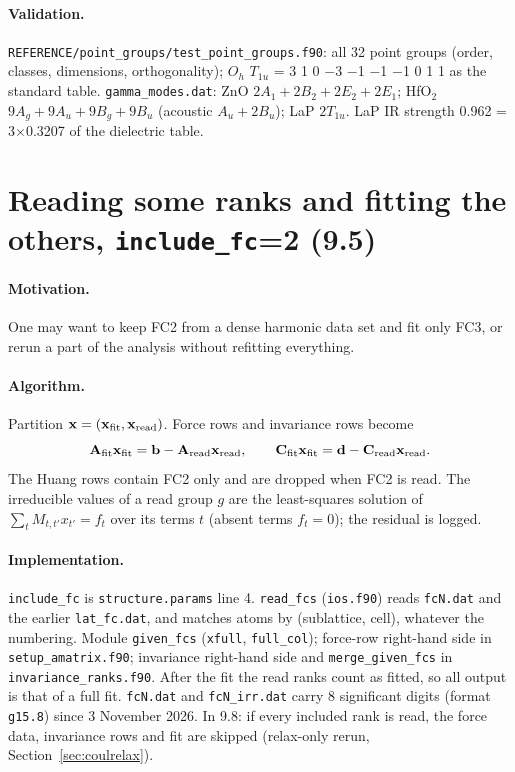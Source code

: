 \documentclass[11pt,a4paper]{article}
\newcommand{\bA}{\mathbf A}
\newcommand{\bC}{\mathbf C}
\newcommand{\bx}{\mathbf x}
\newcommand{\bb}{\mathbf b}
\newcommand{\bd}{\mathbf d}
\newcommand{\code}[1]{\texttt{#1}}
\begin{document}
\paragraph{Validation.} \code{REFERENCE/point\_groups/test\_point\_groups.f90}: all 32 point groups (order,
classes, dimensions, orthogonality); $O_h$ $T_{1u}$ = 3 1 0 $-$3 $-$1 $-$1 $-$1 0 1 1 as the standard table.
\code{gamma\_modes.dat}: ZnO $2A_1+2B_2+2E_2+2E_1$; HfO$_2$ $9A_g+9A_u+9B_g+9B_u$ (acoustic $A_u+2B_u$); LaP
$2T_{1u}$. LaP IR strength 0.962 = 3$\times$0.3207 of the dielectric table.

\section{\texorpdfstring{Reading some ranks and fitting the others, \code{include\_fc}=2 (9.5)}{Reading some ranks and fitting the others, include\_fc=2 (9.5)}}\label{sec:incl2}
\paragraph{Motivation.} One may want to keep FC2 from a dense harmonic data set and fit only FC3, or rerun a
part of the analysis without refitting everything.

\paragraph{Algorithm.} Partition $\bx=(\bx_{\rm fit},\bx_{\rm read})$. Force rows and invariance rows
become
\begin{equation}
\bA_{\rm fit}\bx_{\rm fit}=\bb-\bA_{\rm read}\bx_{\rm read},\qquad
\bC_{\rm fit}\bx_{\rm fit}=\bd-\bC_{\rm read}\bx_{\rm read} .
\end{equation}
The Huang rows contain FC2 only and are dropped when FC2 is read. The irreducible values of a read group
$g$ are the least-squares solution of $\sum_tM_{t,t'}x_{t'}=f_t$ over its terms $t$ (absent terms
$f_t=0$); the residual is logged.

\paragraph{Implementation.} \code{include\_fc} is \code{structure.params} line 4. \code{read\_fcs}
(\code{ios.f90}) reads \code{fcN.dat} and the earlier \code{lat\_fc.dat}, and matches atoms by (sublattice,
cell), whatever the numbering. Module \code{given\_fcs} (\code{xfull}, \code{full\_col}); force-row
right-hand side in \code{setup\_amatrix.f90}; invariance right-hand side and \code{merge\_given\_fcs} in
\code{invariance\_ranks.f90}. After the fit the read ranks count as fitted, so all output is that of a full
fit. \code{fcN.dat} and \code{fcN\_irr.dat} carry 8 significant digits (format \code{g15.8}) since 3 November
2026. In 9.8: if every included rank is read, the force data, invariance rows and fit are skipped
(relax-only rerun, Section~\ref{sec:coulrelax}).
\end{document}
